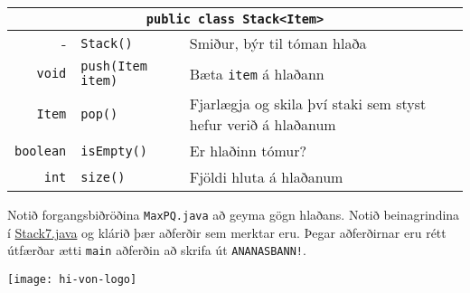 \documentclass{article}
\begin{document}
\begin{center}
\begin{tabularx}{\textwidth}{rlX}
\toprule
\multicolumn{3}{c}{\texttt{public class Stack<Item>}}\\
\midrule
-&\texttt{Stack()}& Smiður, býr til tóman hlaða\\
\texttt{void}&\texttt{push(Item item)}&Bæta \texttt{item} á hlaðann\\
\texttt{Item}&\texttt{pop()}&Fjarlægja og skila því staki sem styst hefur verið á hlaðanum\\
\texttt{boolean}&\texttt{isEmpty()}&Er hlaðinn tómur?\\
\texttt{int}&\texttt{size()}&Fjöldi hluta á hlaðanum\\
\bottomrule
\end{tabularx}
\end{center}

Notið forgangsbiðröðina \texttt{MaxPQ.java} að geyma gögn hlaðans. Notið beinagrindina í \href{https://github.com/Ernir/kennsluefni/tree/master/T2/Code/w7/Stack7.java}{Stack7.java} og klárið þær aðferðir sem merktar eru. Þegar aðferðirnar eru rétt útfærðar ætti \texttt{main} aðferðin að skrifa út \texttt{ANANASBANN!}.

\vfill
\texttt{[image: hi-von-logo]}
\end{document}
